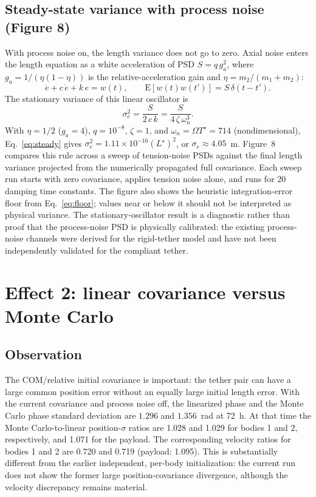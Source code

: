 \documentclass{article}
\begin{document}
\subsection{Steady-state variance with process noise (Figure 8)}

With process noise on, the length variance does not go to zero. Axial
noise enters the length equation as a white acceleration of PSD
$S = q\,g_a^{2}$, where $g_a = 1/(\eta(1-\eta))$ is the relative-acceleration
gain and $\eta = m_2/(m_1+m_2)$:
\begin{equation}
  \ddot e + c\,\dot e + k\,e = w(t), \qquad
  \mathrm{E}[w(t)w(t')] = S\,\delta(t-t').
\end{equation}
The stationary variance of this linear oscillator is
\begin{equation}
  \sigma_{e}^{2} = \frac{S}{2\,c\,k} = \frac{S}{4\,\zeta\,\omega_n^{3}} .
  \label{eq:steady}
\end{equation}
With $\eta = 1/2$ ($g_a = 4$), $q = 10^{-8}$, $\zeta = 1$, and
$\omega_n = \Omega T^{\star} = 714$ (nondimensional), Eq.~\eqref{eq:steady}
gives $\sigma_e^2 = 1.11\times10^{-16}(L^{\star})^2$, or
$\sigma_e \approx 4.05$~m. Figure~8 compares this rule across a sweep of
tension-noise PSDs against the final length variance projected from the
numerically propagated full covariance. Each sweep run starts with zero
covariance, applies tension noise alone, and runs for 20 damping time
constants. The figure also shows the heuristic integration-error floor from
Eq.~\eqref{eq:floor}; values near or below it should not be interpreted as
physical variance. The stationary-oscillator result is a diagnostic rather
than proof that the process-noise PSD is physically calibrated: the existing
process-noise channels were derived for the rigid-tether model and have not
been independently validated for the compliant tether.

\section{Effect 2: linear covariance versus Monte Carlo}

\subsection{Observation}

The COM/relative initial covariance is important: the tether pair can have a
large common position error without an equally large initial length error.
With the current covariance and process noise off, the linearized phase and
the Monte Carlo phase standard deviation are $1.296$ and $1.356$~rad at 72~h.
At that time the Monte Carlo-to-linear position-$\sigma$ ratios are 1.028 and
1.029 for bodies 1 and 2, respectively, and 1.071 for the payload. The
corresponding velocity ratios for bodies 1 and 2 are 0.720 and 0.719 (payload:
1.095). This is substantially different from the earlier independent,
per-body initialization: the current run does not show the former large
position-covariance divergence, although the velocity discrepancy remains
material.
\end{document}
